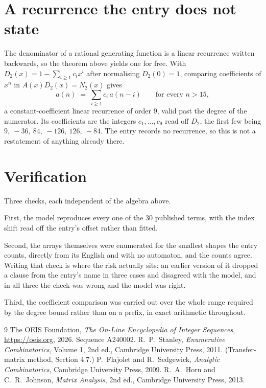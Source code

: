 \documentclass[11pt,a4paper]{article}
\theoremstyle{plain}
\theoremstyle{definition}
\begin{document}
\section{A recurrence the entry does not state}

The denominator of a rational generating function is a linear recurrence written backwards, so
the theorem above yields one for free. With $D_2(x)=1-\sum_{i\ge1}c_ix^i$ after normalising
$D_2(0)=1$, comparing coefficients of $x^n$ in $A(x)D_2(x)=N_2(x)$ gives
\[
a(n)\;=\;\sum_{i\ge1}c_i\,a(n-i)\qquad\text{for every }n>15,
\]
a constant-coefficient linear recurrence of order $9$, valid past the degree of the
numerator. Its coefficients are the integers $c_1,\dots,c_{9}$ read off $D_2$, the first few being $9,\ -36,\ 84,\ -126,\ 126,\ -84$. The entry records no recurrence, so this is not a restatement of anything
already there.

\section{Verification}

Three checks, each independent of the algebra above.

First, the model reproduces every one of the $30$ published terms, with the index shift
read off the entry's offset rather than fitted.

Second, the arrays themselves were enumerated for the smallest shapes the entry counts,
directly from its English and with no automaton, and the counts agree. Writing that check is
where the risk actually sits: an earlier version of it dropped a clause from the entry's name
in three cases and disagreed with the model, and in all three the check was wrong and the model
was right.

Third, the coefficient comparison was carried out over the whole range required by the degree
bound rather than on a prefix, in exact arithmetic throughout.

\begin{thebibliography}{9}
 The OEIS Foundation, \emph{The On-Line Encyclopedia of Integer
Sequences}, \url{https://oeis.org}, 2026. Sequence A240002.
 R.~P.~Stanley, \emph{Enumerative Combinatorics}, Volume 1, 2nd ed.,
Cambridge University Press, 2011. (Transfer-matrix method, Section 4.7.)
 P.~Flajolet and R.~Sedgewick, \emph{Analytic Combinatorics}, Cambridge
University Press, 2009.
 R.~A.~Horn and C.~R.~Johnson, \emph{Matrix Analysis}, 2nd ed., Cambridge
University Press, 2013.
\end{thebibliography}
\end{document}
